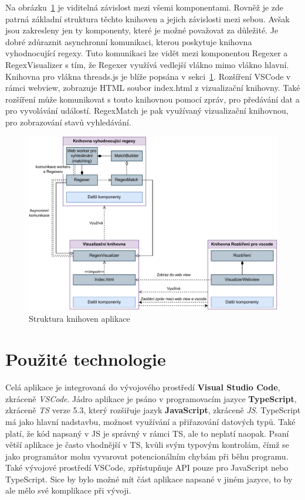 Na obrázku~\ref{fig:ARCH} je viditelná závislost mezi všemi komponentami. 
Rovněž je zde patrná základní struktura těchto knihoven a jejich závislosti mezi sebou.
Avšak jsou zakresleny jen ty komponenty, které je možné považovat za důležité. 
Je dobré zdůraznit asynchronní komunikaci, kterou poskytuje knihovna vyhodnocující regexy.
Tuto komunikaci lze vidět mezi komponentou Regexer a RegexVisualizer s tím, že Regexer využívá vedlejší vlákno mimo vlákno hlavní. 
Knihovna pro vlákna threads.js je blíže popsána v sekci~\ref{sec:USEDtech}.
Rozšíření VSCode v rámci webview, zobrazuje HTML soubor index.html z vizualizační knihovny.
Také rozšíření může komunikovat s touto knihovnou pomocí zpráv, pro předávání dat a pro vyvolávání událostí. 
RegexMatch je pak využívaný vizualizační knihovnou, pro zobrazování stavů vyhledávání.

\begin{figure}[!h]
	\centering
	\includegraphics[width=.9\textwidth]{Figures/BP-Arch.pdf}
	\caption{Struktura knihoven aplikace}
	\label{fig:ARCH}
\end{figure}

\newpage

\section{Použité technologie}\label{sec:USEDtech}
Celá aplikace je integrovaná do vývojového prostředí \textbf{Visual Studio Code}, zkráceně \textit{VSCode}. 
Jádro aplikace je psáno v programovacím jazyce \textbf{TypeScript}, zkráceně \textit{TS} verze 5.3, který rozšiřuje jazyk \textbf{JavaScript}, zkráceně \textit{JS}. 
TypeScript má jako hlavní nadstavbu, možnost využívání a přiřazování datových typů.
Také platí, že kód napsaný v JS je správný v rámci TS, ale to neplatí naopak.
Psaní větší aplikace je často vhodnější v TS, kvůli svým typovým kontrolám, čímž se jako programátor mohu vyvarovat potencionálním chybám při běhu programu.
Také vývojové prostředí VSCode, zpřístupňuje API pouze pro JavaScript nebo TypeScript.
Sice by bylo možné mít část aplikace napsané v jiném jazyce, to by ale mělo své komplikace při vývoji.

